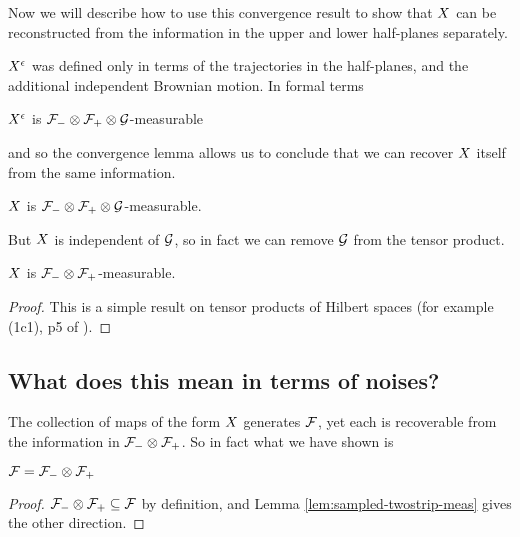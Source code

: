 {\begin{lemma}
  \label{lem:resamplede-to-sampled}
  \statementoflemresampledetosampled
\end{lemma}

Now we will describe how to use this convergence result to show that
$X$ can be reconstructed from the information in the upper and
lower half-planes separately.

$X^{\epsilon}$ was defined only in terms of the trajectories in the
half-planes, and the additional independent Brownian
motion.  In formal terms

\begin{obs}
  $X^{\epsilon}$ is $\mathcal{F}_{-} \otimes \mathcal{F}_{+} \otimes \mathcal{G}$-measurable
\end{obs}

and so the convergence lemma allows us to conclude that we can
recover $X$ itself from the same information.

\begin{cor}
  \label{cor:sampled-twostripsreservoir-meas}
  $X$ is $\mathcal{F}_{-} \otimes \mathcal{F}_{+} \otimes \mathcal{G}$-measurable.
\end{cor}
  
But $X$ is independent of $\mathcal{G}$, so in fact we can
remove $\mathcal{G}$ from the tensor product.

\begin{lemma}
  \label{lem:sampled-twostrip-meas}
  $X$ is $\mathcal{F}_{-} \otimes \mathcal{F}_{+}$-measurable.
\end{lemma}

\begin{proof}
  This is a simple result on tensor products of
  Hilbert spaces (for example (1c1), p5 of
  \cite{tsirelson-completion}).
\end{proof}

\subsection{What does this mean in terms of noises?}

The collection of maps of the form $X$ generates
$\mathcal{F}$, yet each is recoverable from the information in
$\mathcal{F}_{-} \otimes \mathcal{F}_{+}$.  So in fact what we have shown is

\begin{theorem}
  $\mathcal{F} = \mathcal{F}_{-} \otimes \mathcal{F}_{+}$
\end{theorem}

\begin{proof}
  $\mathcal{F}_{-} \otimes \mathcal{F}_{+} \subseteq \mathcal{F}$ by definition, and Lemma
  \ref{lem:sampled-twostrip-meas} gives the other direction.
\end{proof}
}
